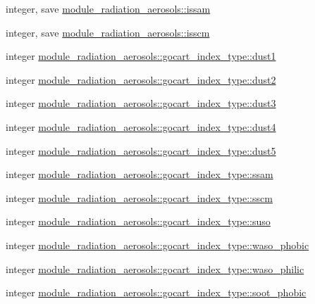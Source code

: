 \begin{DoxyCompactItemize}
integer, save \hyperlink{group__module__radiation__aerosols_gab64435256571a80bbb577fc4f27b39ee}{module\+\_\+radiation\+\_\+aerosols\+::issam}
\item 
integer, save \hyperlink{group__module__radiation__aerosols_ga762cff73e22fefab8adf68d08d5c4df1}{module\+\_\+radiation\+\_\+aerosols\+::isscm}
\item 
integer \hyperlink{group__module__radiation__aerosols_gae87b7754284ce0d44cab3ab11c7d302d}{module\+\_\+radiation\+\_\+aerosols\+::gocart\+\_\+index\+\_\+type\+::dust1}
\item 
integer \hyperlink{group__module__radiation__aerosols_gaaf95cb5b3df728ac3b333edd8ab7820f}{module\+\_\+radiation\+\_\+aerosols\+::gocart\+\_\+index\+\_\+type\+::dust2}
\item 
integer \hyperlink{group__module__radiation__aerosols_ga5d844db6dd6100b45808b5e19b468a84}{module\+\_\+radiation\+\_\+aerosols\+::gocart\+\_\+index\+\_\+type\+::dust3}
\item 
integer \hyperlink{group__module__radiation__aerosols_ga26a20aa03ac34523cc19644000d4924e}{module\+\_\+radiation\+\_\+aerosols\+::gocart\+\_\+index\+\_\+type\+::dust4}
\item 
integer \hyperlink{group__module__radiation__aerosols_ga7d24acaa59ee8524dd8eca8f91f740c6}{module\+\_\+radiation\+\_\+aerosols\+::gocart\+\_\+index\+\_\+type\+::dust5}
\item 
integer \hyperlink{group__module__radiation__aerosols_ga911c3dc2e5722a38166950003a4d0875}{module\+\_\+radiation\+\_\+aerosols\+::gocart\+\_\+index\+\_\+type\+::ssam}
\item 
integer \hyperlink{group__module__radiation__aerosols_ga814b63e33cdf9c3e1e470406056a9fcb}{module\+\_\+radiation\+\_\+aerosols\+::gocart\+\_\+index\+\_\+type\+::sscm}
\item 
integer \hyperlink{group__module__radiation__aerosols_ga1556732edff9dba1d6593a1117af056f}{module\+\_\+radiation\+\_\+aerosols\+::gocart\+\_\+index\+\_\+type\+::suso}
\item 
integer \hyperlink{group__module__radiation__aerosols_ga9975caaff0c49d25180699beb469601f}{module\+\_\+radiation\+\_\+aerosols\+::gocart\+\_\+index\+\_\+type\+::waso\+\_\+phobic}
\item 
integer \hyperlink{group__module__radiation__aerosols_ga05425c83c167f7820a126c72e561a4da}{module\+\_\+radiation\+\_\+aerosols\+::gocart\+\_\+index\+\_\+type\+::waso\+\_\+philic}
\item 
integer \hyperlink{group__module__radiation__aerosols_gabe87221aca998b4d7ca231525e7dc355}{module\+\_\+radiation\+\_\+aerosols\+::gocart\+\_\+index\+\_\+type\+::soot\+\_\+phobic}

\end{DoxyCompactItemize}
